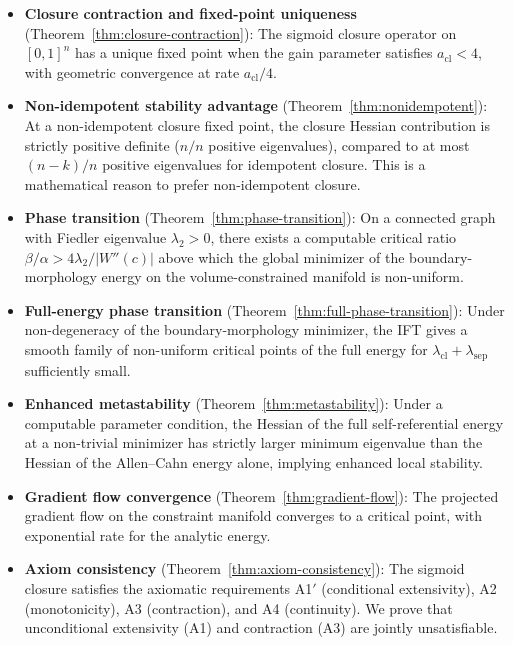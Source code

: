 \documentclass[lettersize,journal]{IEEEtran}
\begin{document}
\begin{itemize}
\item \textbf{Closure contraction and fixed-point uniqueness} (Theorem~\ref{thm:closure-contraction}): The sigmoid closure operator on $[0,1]^n$ has a unique fixed point when the gain parameter satisfies $a_{\mathrm{cl}} < 4$, with geometric convergence at rate $a_{\mathrm{cl}}/4$.

\item \textbf{Non-idempotent stability advantage} (Theorem~\ref{thm:nonidempotent}): At a non-idempotent closure fixed point, the closure Hessian contribution is strictly positive definite ($n/n$ positive eigenvalues), compared to at most $(n-k)/n$ positive eigenvalues for idempotent closure. This is a mathematical reason to prefer non-idempotent closure.

\item \textbf{Phase transition} (Theorem~\ref{thm:phase-transition}): On a connected graph with Fiedler eigenvalue $\lambda_2 > 0$, there exists a computable critical ratio $\beta/\alpha > 4\lambda_2/|W''(c)|$ above which the global minimizer of the boundary-morphology energy on the volume-constrained manifold is non-uniform.

\item \textbf{Full-energy phase transition} (Theorem~\ref{thm:full-phase-transition}): Under non-degeneracy of the boundary-morphology minimizer, the IFT gives a smooth family of non-uniform critical points of the full energy for $\lambda_{\mathrm{cl}} + \lambda_{\mathrm{sep}}$ sufficiently small.

\item \textbf{Enhanced metastability} (Theorem~\ref{thm:metastability}): Under a computable parameter condition, the Hessian of the full self-referential energy at a non-trivial minimizer has strictly larger minimum eigenvalue than the Hessian of the Allen--Cahn energy alone, implying enhanced local stability.

\item \textbf{Gradient flow convergence} (Theorem~\ref{thm:gradient-flow}): The projected gradient flow on the constraint manifold converges to a critical point, with exponential rate for the analytic energy.

\item \textbf{Axiom consistency} (Theorem~\ref{thm:axiom-consistency}): The sigmoid closure satisfies the axiomatic requirements A1$'$ (conditional extensivity), A2 (monotonicity), A3 (contraction), and A4 (continuity). We prove that unconditional extensivity (A1) and contraction (A3) are jointly unsatisfiable.


\end{itemize}
\end{document}
